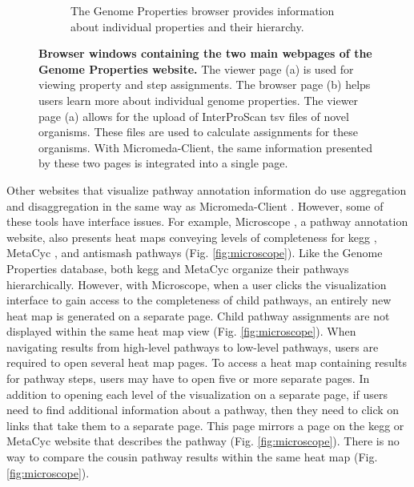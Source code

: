 \begin{figure}[!ht]
\begin{subfigure}[b]{0.46\textwidth}
     \caption{The Genome Properties browser provides information about 
individual properties and their hierarchy.}
     \label{fig:property-browser}
   \end{subfigure}
   \caption[Browser windows containing the two main webpages of the Genome 
Properties website.]{\textbf{Browser windows containing the two main webpages of 
the Genome Properties website.} The viewer page (a) is used for viewing property and 
step assignments. The browser page (b) helps users learn more about 
individual genome properties. The viewer page (a) allows for the upload of 
InterProScan \gls{tsv} files of novel organisms. These files are used to 
calculate assignments for these organisms. With Micromeda-Client, the same 
information presented by these two pages is integrated into a single page.}
   \label{fig:genome-properties-interface}
\end{figure}

Other websites that visualize pathway annotation information do use aggregation 
and disaggregation in the same way as Micromeda-Client 
\cite{vallenet2016microscope,darzi2019functree2}. However, some of these tools 
have interface issues. For example, Microscope \cite{vallenet2016microscope}, a 
pathway annotation website, also presents heat maps conveying levels of 
completeness for \gls{kegg} \cite{kanehisa2000kegg}, MetaCyc 
\cite{karp2002metacyc}, and \gls{antismash} \cite{blin2019antismash} pathways 
(Fig. \ref{fig:microscope}). Like the Genome Properties database, both 
\gls{kegg} and MetaCyc organize their pathways hierarchically. However, with 
Microscope, when a user clicks the visualization interface to gain access to the 
completeness of child pathways, an entirely new heat map is generated on a 
separate page. Child pathway assignments are not displayed within the same 
heat map view (Fig. \ref{fig:microscope}). When navigating results from 
high-level pathways to low-level pathways, users are required to open several 
heat map pages. To access a heat map containing results for pathway steps, 
users may have to open five or more separate pages. In addition to opening each 
level of the visualization on a separate page, if users need to find additional 
information about a pathway, then they need to click on links that take them to 
a separate page. This page mirrors a page on the \gls{kegg} or MetaCyc website 
that describes the pathway (Fig. \ref{fig:microscope}). There is no way to 
compare the cousin pathway results within the same heat map 
(Fig. \ref{fig:microscope}).

